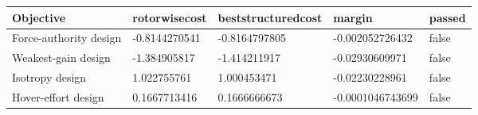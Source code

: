 \begin{tabular}{@{}lllll@{}}
\toprule
Objective & rotorwisecost & beststructuredcost & margin & passed \\
\midrule
Force-authority design & -0.8144270541 & -0.8164797805 & -0.002052726432 & false \\
Weakest-gain design & -1.384905817 & -1.414211917 & -0.02930609971 & false \\
Isotropy design & 1.022755761 & 1.000453471 & -0.02230228961 & false \\
Hover-effort design & 0.1667713416 & 0.1666666673 & -0.0001046743699 & false \\
\bottomrule
\end{tabular}

